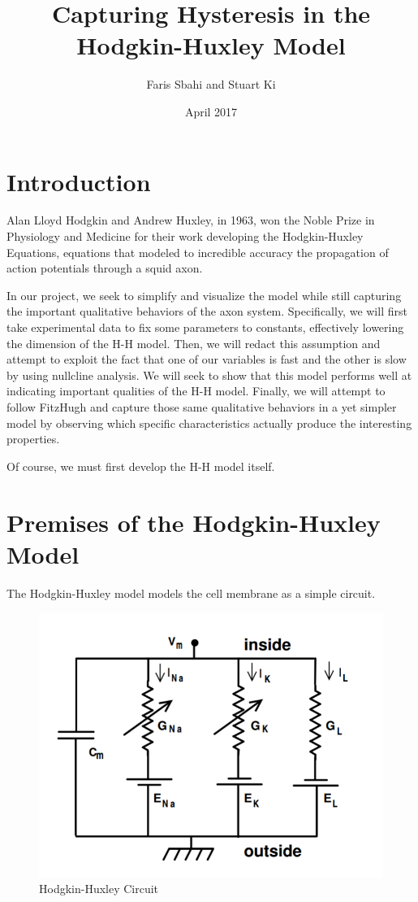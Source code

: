 \documentclass{article}
\title{Capturing Hysteresis in the Hodgkin-Huxley Model}
\author{Faris Sbahi and Stuart Ki}
\date{April 2017}
\begin{document}
\maketitle

\section{Introduction}

Alan Lloyd Hodgkin and Andrew Huxley, in 1963, won the Noble Prize in Physiology and Medicine for their work developing the Hodgkin-Huxley Equations, equations that modeled to incredible accuracy the propagation of action potentials through a squid axon. 

In our project, we seek to simplify and visualize the model while still capturing the important qualitative behaviors of the axon system. Specifically, we will first take experimental data to fix some parameters to constants, effectively lowering the dimension of the H-H model. Then, we will redact this assumption and attempt to exploit the fact that one of our variables is fast and the other is slow by using nullcline analysis. We will seek to show that this model performs well at indicating important qualities of the H-H model. Finally, we will attempt to follow FitzHugh\cite{FITZHUGH1961445} and capture those same qualitative behaviors in a yet simpler model by observing which specific characteristics actually produce the interesting properties. 

Of course, we must first develop the H-H model itself.

\section{Premises of the Hodgkin-Huxley Model}

The Hodgkin-Huxley model models the cell membrane as a simple circuit. 

\begin{figure}[h]
    \centering
    \includegraphics[scale=0.5]{hhmodel}
    \caption{Hodgkin-Huxley Circuit}
    \label{fig:my_label}
\end{figure}
\end{document}
